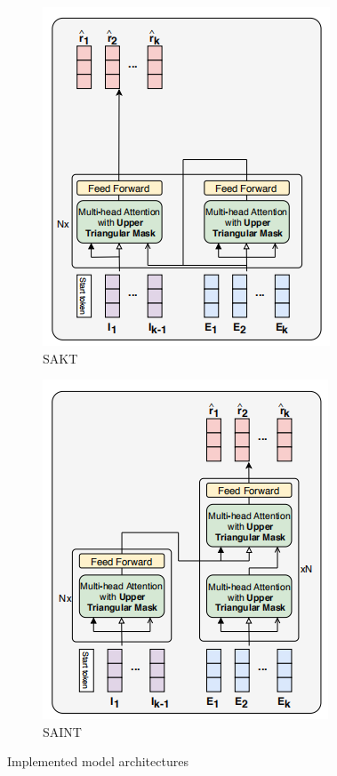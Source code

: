 \documentclass{article}
\begin{document}
\begin{figure}[h]
\begin{subfigure}{.5\textwidth}
  \centering
  \includegraphics[width=.8\linewidth]{SAKT.png}
  \caption{SAKT}
  \label{fig:SAKt}
\end{subfigure}%
\begin{subfigure}{.5\textwidth}
  \centering
  \includegraphics[width=.8\linewidth]{SAINT.png}
  \caption{SAINT}
  \label{fig:SAINT}
\end{subfigure}
\caption{Implemented model architectures \cite{Choi2020}}
\label{fig:fig}
\end{figure}
\end{document}
